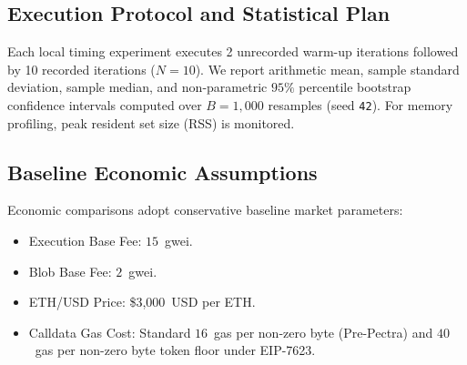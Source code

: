 \subsection{Execution Protocol and Statistical Plan}
Each local timing experiment executes 2 unrecorded warm-up iterations followed by 10 recorded iterations ($N=10$). We report arithmetic mean, sample standard deviation, sample median, and non-parametric $95\%$ percentile bootstrap confidence intervals computed over $B = 1,000$ resamples (seed \texttt{42}). For memory profiling, peak resident set size (RSS) is monitored.

\subsection{Baseline Economic Assumptions}
Economic comparisons adopt conservative baseline market parameters:
\begin{itemize}
    \item Execution Base Fee: $15$~gwei.
    \item Blob Base Fee: $2$~gwei.
    \item ETH/USD Price: \$3,000~USD per ETH.
    \item Calldata Gas Cost: Standard $16$~gas per non-zero byte (Pre-Pectra) and $40$~gas per non-zero byte token floor under EIP-7623.
\end{itemize}
